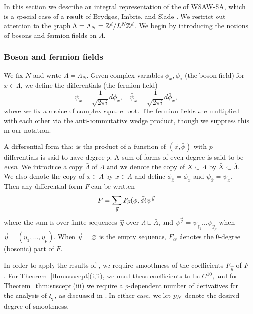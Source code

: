 In this section we describe an integral representation of the of WSAW-SA, which
is a special case of a result of Brydges, Imbrie, and Slade \cite{BIS09}.
We restrict out attention to the graph $\Lambda = \Lambda_N = { {{\mathbb Z}}^d }/L^N{ {{\mathbb Z}}^d }$.
We begin by introducing the notions of bosons and fermion fields on $\Lambda$.

\subsubsection{Boson and fermion fields}
\label{sec:forms}

We fix $N$ and write $\Lambda = \Lambda_N$.
Given complex variables $\phi_x, \bar\phi_x$
(the boson field) for $x \in \Lambda$,
we define the differentials (the fermion field)
\begin{equation}
\psi_x = \frac{1}{\sqrt{2\pi i}} d\phi_x,
\quad
\bar\psi_x = \frac{1}{\sqrt{2\pi i}} d\bar\phi_x,
\end{equation}
where we fix a choice of complex square root.
The fermion fields are multiplied with each other
via the anti-commutative wedge product,
though we suppress this in our notation.

A differential form that is the
product of a function of $(\phi, \bar\phi)$
with $p$ differentials is said to have degree $p$.
A sum of forms of even degree is said to be \emph{even}.
We introduce a copy $\bar\Lambda$ of $\Lambda$
and we denote the copy of $X \subset \Lambda$ by $\bar X \subset \bar\Lambda$.
We also denote the copy of $x \in \Lambda$
by $\bar x \in \bar\Lambda$ and define $\phi_{\bar x} = \bar\phi_x$ and $\psi_{\bar x} = \bar\psi_x$.
Then any differential form $F$ can be written
\begin{equation}
\lbeq{FinNcal}
F
=
\sum_{\vec y}
F_{\vec y} (\phi, \bar\phi)
\psi^{\vec y}
\end{equation}
where the sum is over finite sequences $\vec y$ over $\Lambda\sqcup\bar\Lambda$,
and $\psi^{\vec y} = \psi_{y_1} \ldots \psi_{y_p}$ when $\vec y = (y_1, \ldots, y_p)$.
When $\vec y = \varnothing$ is the empty sequence,
$F_\varnothing$ denotes the $0$-degree (bosonic) part of $F$.

In order to apply the results of \cite{BBS-saw4-log,BBS-saw4,BSTW-clp}, we require
smoothness of the coefficients $F_{\vec y}$ of $F$.  For Theorem~\ref{thm:suscept}(i,ii),
we need these coefficients to be $C^{10}$, and for Theorem~\ref{thm:suscept}(iii) we require
a $p$-dependent number of derivatives for the analysis of $\xi_p$, as discussed in \cite{BSTW-clp}.
In either case, we let $p_{\mathcal{N}}$ denote the desired degree of smoothness.

